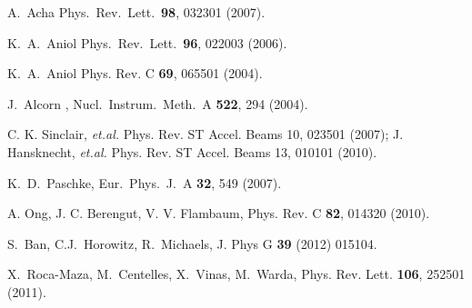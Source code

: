   A.~Acha \etal 
  Phys.\ Rev.\ Lett.\  {\bf 98}, 032301 (2007).

  K.~A.~Aniol \etal  
  Phys.\ Rev.\ Lett.\  {\bf 96}, 022003 (2006).

  K.~A.~Aniol \etal  
  Phys. Rev. C {\bf 69}, 065501 (2004). 

  J.~Alcorn  %
 \etal,  %
  Nucl.\ Instrum.\ Meth.\ A {\bf 522}, 294 (2004).
%

C. K. Sinclair, {\it et.al.} Phys. Rev. ST Accel. Beams 10, 023501 (2007);
J. Hansknecht, {\it et.al.} Phys. Rev. ST Accel. Beams 13, 010101 (2010).

%
  K.~D.~Paschke,
  Eur.\ Phys.\ J.\  A {\bf 32}, 549 (2007).

 A. Ong, J. C. Berengut, V. V. Flambaum, Phys. Rev. C {\bf 82}, 014320 (2010).

  S.~Ban, C.J.~Horowitz, R.~Michaels,
J. Phys G {\bf 39} (2012) 015104.


  X.~Roca-Maza, M.~Centelles, X.~Vinas, M.~Warda,
Phys. Rev. Lett. {\bf 106}, 252501 (2011).


